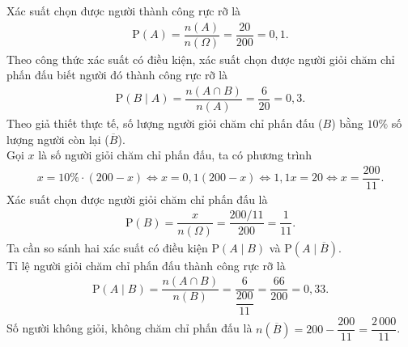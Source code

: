 \begin{ex}
{\begin{center}
		\end{center}
		\begin{itemchoice}
			\itemch Xác suất chọn được người thành công rực rỡ là
			\begin{align*}
				\mathrm{P}(A) = \dfrac{n(A)}{n(\Omega)} = \dfrac{20}{200} = 0{,}1.
			\end{align*}
			\itemch Theo công thức xác suất có điều kiện, xác suất chọn được người giỏi chăm chỉ phấn đấu biết người đó thành công rực rỡ là
			\begin{align*}
				\mathrm{P}(B \mid A) = \dfrac{n(A \cap B)}{n(A)} = \dfrac{6}{20} = 0{,}3.
			\end{align*}
			\itemch Theo giả thiết thực tế, số lượng người giỏi chăm chỉ phấn đấu ($B$) bằng $10\%$ số lượng người còn lại ($\overline{B}$).\\ Gọi $x$ là số người giỏi chăm chỉ phấn đấu, ta có phương trình
			\begin{align*}
				x = 10\% \cdot (200 - x) \Leftrightarrow x = 0{,}1(200 - x) \Leftrightarrow 1{,}1 x = 20 \Leftrightarrow x = \dfrac{200}{11}.
			\end{align*}
			Xác suất chọn được người giỏi chăm chỉ phấn đấu là
			\begin{align*}
				\mathrm{P}(B) = \dfrac{x}{n(\Omega)} = \dfrac{200/11}{200} = \dfrac{1}{11}.
			\end{align*}
			\itemch Ta cần so sánh hai xác suất có điều kiện $\mathrm{P}(A \mid B)$ và $\mathrm{P}\left(A \mid \overline{B}\right)$.\\
			Tỉ lệ người giỏi chăm chỉ phấn đấu thành công rực rỡ là
			\begin{align*}
				\mathrm{P}(A \mid B) = \dfrac{n(A \cap B)}{n(B)} = \dfrac{6}{\dfrac{200}{11}} = \dfrac{66}{200} = 0{,}33.
			\end{align*}
			Số người không giỏi, không chăm chỉ phấn đấu là $n\left(\overline{B}\right) = 200 - \dfrac{200}{11} = \dfrac{2\,000}{11}$.\\

\end{itemchoice}}
\end{ex}

